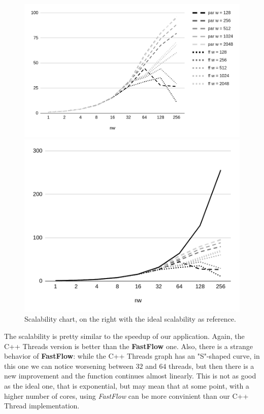 \begin{figure}[H]
    \centering
    \begin{minipage}{.68\linewidth}
        \includegraphics[width=\linewidth]{assets/scalability}
    \end{minipage}
    \begin{minipage}{.3\linewidth}
        \includegraphics[width=\linewidth]{assets/scalability_ideal}
    \end{minipage}
    \caption{Scalability chart, on the right with the ideal scalability as reference.}
    \label{fig:scalability}
\end{figure}

\noindent
The scalability is pretty similar to the speedup of our application. Again, the C++ Threads version is better than the \textbf{FastFlow} one. Also, there is a strange behavior of \textbf{FastFlow}: while the C++ Threads graph has an "S"-shaped curve, in this one we can notice worsening between $32$ and $64$ threads, but then there is a new improvement and the function continues almost linearly. This is not as good as the ideal one, that is exponential, but may mean that at some point, with a higher number of cores, using \textit{FastFlow} can be more convinient than our C++ Thread implementation.



